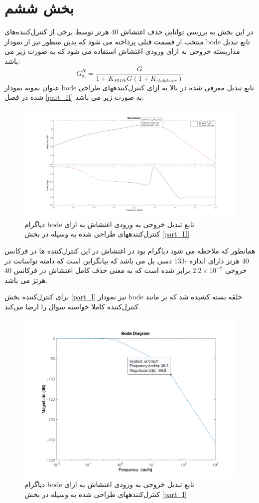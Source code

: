 \chapter{بخش ششم}
در این بخش به بررسی توانایی حذف اغتشاش 40 هرتز توسط برخی از کنترل‌کننده‌های منتخب از قسمت قبلی پرداخته می شود که بدین منظور نیز از نمودار bode تابع تبدیل مداربسته خروجی به ازای ورودی اغتشاش استفاده می شود که به صورت زیر می باشد:
$$
G_{d_i}^R = \dfrac{G}{1+K_{PIDF}G(1+K_{stabilizer})}
$$
عنوان نمونه نمودار bode تابع تبدیل معرفی شده در بالا به ازای کنترل‌کنندههای طراحی شده در فصل \ref{part_II} به صورت زیر می باشد: 
\begin{figure}[H]
	\centering
	\includegraphics[width=12cm]{../Figure/P_VI/PID_tunner_dis_rej.png}
	\caption{‌دیاگرام bode تابع تبدیل خروجی به ورودی اغتشاش به ازای کنترل‌کنندههای طراحی شده به وسیله 
	در بخش \ref{part_II}}
\end{figure}
همانطور که ملاحظه می شود دیاگرام بود در اغتشاش در این کنترل‌کننده ها در فرکانس 40 هرتز دارای اندازه -133  دسی بل می باشد که بیانگراین است که دامنه نواسانت در خروجی $2.2\times 10^{-7}$ برابر شده است که به معنی حذف کامل اغتشاش در فرکانس 40 هرتز می باشد.



برای کنترل‌کننده بخش
\ref{part_I}
نیز نمودار bode حلقه بسته کشیده شد که بر مانند کنترل‌کننده کاملا خواسته سوال را ارضا می‌کند.
\begin{figure}[H]
	\centering
	\includegraphics[width=12cm]{../Figure/P_I/PID_bode.png}
	\caption{‌دیاگرام bode تابع تبدیل خروجی به ورودی اغتشاش به ازای کنترل‌کنندههای طراحی شده به وسیله 
		در بخش \ref{part_I}}
\end{figure}